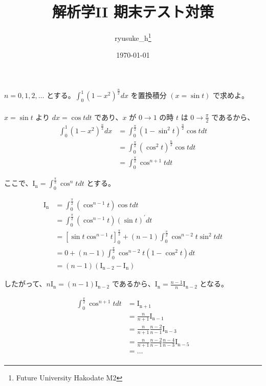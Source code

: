 \documentclass[a4j]{jsarticle}
\title{解析学II 期末テスト対策}
\author{ryusuke\_h\thanks{Future University Hakodate M2}}
\date{\today}
\begin{document}
    \maketitle

    $n = 0,1,2,\dots$ とする。$\displaystyle \int_{0}^{1} \left(1 - x^2 \right)^{\frac{n}{2}} dx$ を置換積分 $(x = \sin t)$ で求めよ。 \\ \\

    $x = \sin t$ より $dx = \cos t dt$ であり、$x$ が $0 \rightarrow 1$ の時 $t$ は $\displaystyle 0 \rightarrow \frac{\pi}{2}$ であるから、
    \begin{align*}
        \int_{0}^{1} \left(1 - x^2 \right)^{\frac{n}{2}} dx &= \int_{0}^{\frac{\pi}{2}} \left(1 - \sin^2t \right)^{\frac{n}{2}}\cos t dt \\
        &= \int_{0}^{\frac{\pi}{2}} \left(\cos^2t \right)^{\frac{n}{2}}\cos t dt \\
        &= \int_{0}^{\frac{\pi}{2}} \cos^{n + 1}t dt
    \end{align*}

    ここで、$\displaystyle \mathrm{I_n} = \int_{0}^{\frac{\pi}{2}} \cos^n t dt$ とする。

    \begin{align*}
        \mathrm{I_n} &= \int_{0}^{\frac{\pi}{2}} \left(\cos^{n - 1} t\right)\cos t dt \\
        &= \int_{0}^{\frac{\pi}{2}} \left(\cos^{n - 1} t\right)\left(\sin t\right)^{\prime} dt \\
        &= \left[\sin t \cos^{n - 1} t\right]_{0}^{\frac{\pi}{2}} + (n - 1) \int_{0}^{\frac{\pi}{2}} \cos^{n - 2}t \sin^2t dt \\
        &= 0 + (n - 1) \int_{0}^{\frac{\pi}{2}} \cos^{n - 2}t \left(1 - \cos^2 t\right) dt \\
        &= (n - 1)(\mathrm{I_{n - 2}} - \mathrm{I_n})
    \end{align*}

    したがって、$\displaystyle n \mathrm{I_n} = (n - 1)\mathrm{I_{n - 2}}$ であるから、$\displaystyle \mathrm{I_n} = \frac{n - 1}{n}\mathrm{I_{n - 2}}$ となる。

    \begin{align*}
        \int_{0}^{\frac{\pi}{2}} \cos^{n+1}tdt &= \mathrm{I_{n + 1}} \\
        &= \frac{n}{n + 1}\mathrm{I_{n - 1}} \\
        &= \frac{n}{n + 1} \frac{n - 2}{n - 1} \mathrm{I_{n - 3}} \\
        &= \frac{n}{n + 1} \frac{n - 2}{n - 1} \frac{n - 4}{n - 3} \mathrm{I_{n - 5}} \\
        &= \dots \\
    \end{align*}
\end{document}
